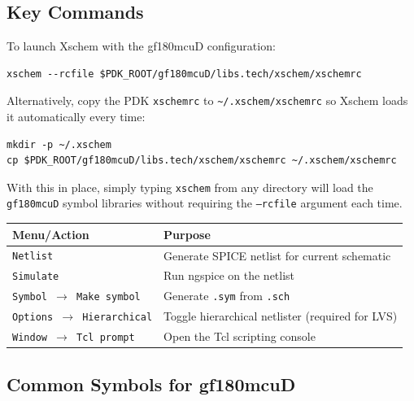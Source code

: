 \documentclass[11pt]{article}
\begin{document}
\subsection*{Key Commands}

\noindent To launch Xschem with the gf180mcuD configuration:
\begin{lstlisting}
xschem --rcfile $PDK_ROOT/gf180mcuD/libs.tech/xschem/xschemrc
\end{lstlisting}

\noindent Alternatively, copy the PDK \texttt{xschemrc} to
\texttt{\textasciitilde/.xschem/xschemrc} so Xschem loads it
automatically every time:
\begin{lstlisting}
mkdir -p ~/.xschem
cp $PDK_ROOT/gf180mcuD/libs.tech/xschem/xschemrc ~/.xschem/xschemrc
\end{lstlisting}
\noindent With this in place, simply typing \texttt{xschem} from any
directory will load the \texttt{gf180mcuD} symbol libraries without
requiring the \texttt{--rcfile} argument each time.

\begin{center}
\begin{tabular}{@{}lp{7.5cm}@{}}
\toprule
\textbf{Menu/Action} & \textbf{Purpose} \\
\midrule
\texttt{Netlist}                    & Generate SPICE netlist for current
                                      schematic \\
\texttt{Simulate}                   & Run ngspice on the netlist \\
\texttt{Symbol $\to$ Make symbol}   & Generate \texttt{.sym} from
                                      \texttt{.sch} \\
\texttt{Options $\to$ Hierarchical} & Toggle hierarchical netlister
                                      (required for LVS) \\
\texttt{Window $\to$ Tcl prompt}    & Open the Tcl scripting console \\
\bottomrule
\end{tabular}
\end{center}

\subsection*{Common Symbols for gf180mcuD}
\end{document}
